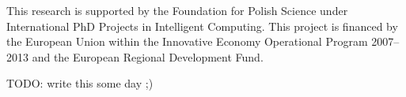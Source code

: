 

This research is supported by the Foundation for Polish Science under International PhD Projects in Intelligent Computing. This project is financed by the European Union within the Innovative Economy Operational Program 2007--2013 and the European Regional Development Fund.

TODO: write this some day ;)